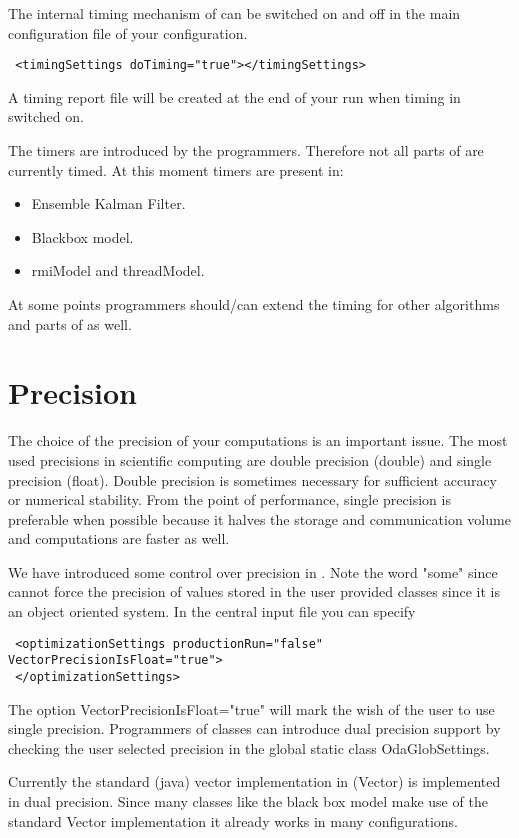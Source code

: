 The internal timing mechanism of \oda can be switched on and off in the main configuration file of your \oda configuration. 
{\footnotesize
\begin{verbatim}
 <timingSettings doTiming="true"></timingSettings>
\end{verbatim}}  
A timing report file will be created at the end of your run when timing in switched on.

The timers are introduced by the programmers. Therefore not all parts of \oda are currently timed. At this moment timers are present in:
\begin{itemize}
\item Ensemble Kalman Filter.
\item Blackbox model.
\item rmiModel and threadModel.
\end{itemize}

At some points programmers should/can extend the timing for other algorithms and parts of \oda as well.

\section{Precision}
The choice of the precision of your computations is an important issue. The most used precisions in scientific computing are double precision (double) and single precision (float). Double precision is sometimes necessary for sufficient accuracy or numerical stability. From the point of performance, single precision is preferable when possible because it halves the storage and communication volume and computations are faster as well.

We have introduced some control over precision in \oda. Note the word "some" since \oda cannot force the precision of values stored in the user provided classes since it is an object oriented system. In the central input file you can specify
{\footnotesize
\begin{verbatim}
 <optimizationSettings productionRun="false" VectorPrecisionIsFloat="true">
 </optimizationSettings>
\end{verbatim}}  
The option VectorPrecisionIsFloat="true" will mark the wish of the user to use single precision. Programmers of \oda classes can introduce dual precision support by checking the user selected precision in the global static class OdaGlobSettings.

Currently the standard (java) vector implementation in \oda (Vector) is implemented in dual precision. Since many classes like the black box model make use of the standard Vector implementation it already works in many configurations. 

